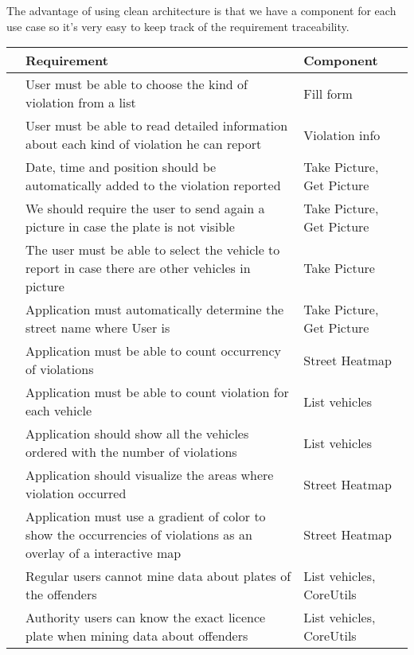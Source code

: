 The advantage of using clean architecture is that we have a component for each use case so it's very easy to keep track of the requirement traceability.

\begin{table}[H]
  \begin {centering}
\begin{tabular}{|l|p{10cm}|p{5cm}|}
\hline
 & \textbf{Requirement} & \textbf{Component} \\ \hline
[R1] & User must be able to choose the kind of violation from a list  &  Fill form \\ \hline  %
[R2] & User must be able to read detailed information about each kind of violation he can report  &  Violation info    \\ \hline %
[R3] & Date, time and position should be automatically added to the violation reported  & Take Picture, Get Picture \\ \hline  %
[R4] & We should require the user to send again a picture in case the plate is not visible & Take Picture, Get Picture \\ \hline %
[R5] & The user must be able to select the vehicle to report in case there are other vehicles in picture & Take Picture \\ \hline %
[R6] & Application must automatically determine the street name where User is & Take Picture, Get Picture \\ \hline  %
[R7] & Application must be able to count occurrency of violations  & Street Heatmap \\ \hline %
[R8] & Application must be able to count violation for each vehicle & List vehicles \\ \hline %
[R9] & Application should show all the vehicles ordered with the number of violations & List vehicles \\ \hline
[R10] & Application should visualize the areas where violation occurred & Street Heatmap\\ \hline %
[R11] & Application must use a gradient of color to show the occurrencies of violations as an overlay of a interactive map & Street Heatmap \\ \hline %
[R12] & Regular users cannot mine data about plates of the offenders & List vehicles, CoreUtils \\ \hline %
[R13] & Authority users can know the exact licence plate when mining data about offenders & List vehicles, CoreUtils \\ \hline %

\end{tabular}
\end{centering}
\end{table}
